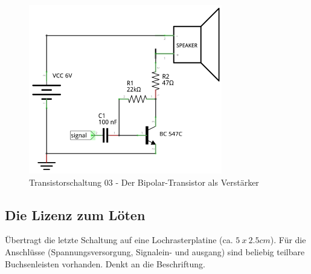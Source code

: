 \begin{figure}[H]
	\centering
	\includegraphics[scale=1.6]{Transistor/Schaltungen/NPN_Verstaerker.pdf}
	\caption{Transistorschaltung 03 - Der Bipolar-Transistor als Verstärker}
	\label{s03}
\end{figure}


\subsection{Die Lizenz zum Löten}

Übertragt die letzte Schaltung auf eine Lochrasterplatine (ca. $5~x~2.5 cm$).
Für die Anschlüsse (Spannungsversorgung, Signalein- und ausgang) sind beliebig
teilbare Buchsenleisten vorhanden. Denkt an die Beschriftung.
